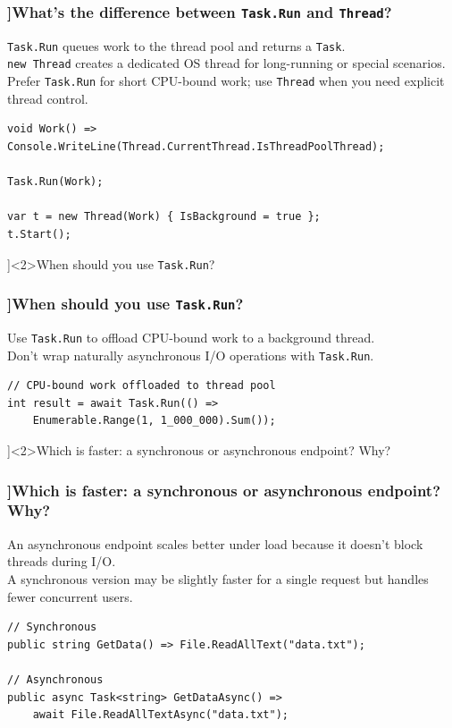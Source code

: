 \begin{frame}[fragile]
  \frametitle{\AnswerTitle[\CategoryBadge[OOPColor!20]{C\#} ]{What's the difference between \texttt{Task.Run} and \texttt{Thread}?}}

  {\footnotesize
  \texttt{Task.Run} queues work to the thread pool and returns a \texttt{Task}.\\
  \texttt{new Thread} creates a dedicated OS thread for long-running or special scenarios.\\
  Prefer \texttt{Task.Run} for short CPU-bound work; use \texttt{Thread} when you need explicit thread control.
  }

  \begin{verbatim}
void Work() => Console.WriteLine(Thread.CurrentThread.IsThreadPoolThread);

Task.Run(Work);

var t = new Thread(Work) { IsBackground = true };
t.Start();
  \end{verbatim}
\end{frame}

\QuestionSlide[\CategoryBadge[PerfColor!20]{Async \& Threading}]<2>{When should you use \texttt{Task.Run}?}

\begin{frame}[fragile]
  \frametitle{\AnswerTitle[\CategoryBadge[OOPColor!20]{C\#} ]{When should you use \texttt{Task.Run}?}}

  {\footnotesize
  Use \texttt{Task.Run} to offload CPU-bound work to a background thread.\\
  Don't wrap naturally asynchronous I/O operations with \texttt{Task.Run}.
  }

  \begin{verbatim}
// CPU-bound work offloaded to thread pool
int result = await Task.Run(() =>
    Enumerable.Range(1, 1_000_000).Sum());
  \end{verbatim}
\end{frame}

\QuestionSlide[\CategoryBadge[PerfColor!20]{Async \& Threading}]<2>{Which is faster: a synchronous or asynchronous endpoint? Why?}

\begin{frame}[fragile]
  \frametitle{\AnswerTitle[\CategoryBadge[OOPColor!20]{C\#} ]{Which is faster: a synchronous or asynchronous endpoint? Why?}}

  {\footnotesize
  An asynchronous endpoint scales better under load because it doesn't block threads during I/O.\\
  A synchronous version may be slightly faster for a single request but handles fewer concurrent users.
  }

  \begin{verbatim}
// Synchronous
public string GetData() => File.ReadAllText("data.txt");

// Asynchronous
public async Task<string> GetDataAsync() =>
    await File.ReadAllTextAsync("data.txt");
  \end{verbatim}
\end{frame}

